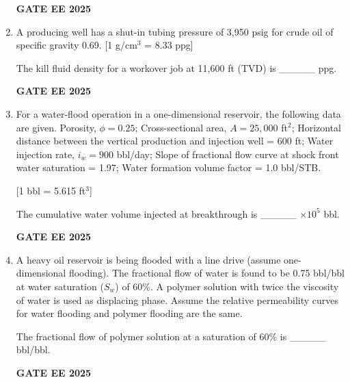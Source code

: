 \documentclass{article}
\begin{document}
\begin{enumerate}[label=Q.\arabic*,start=26]
    \textbf{GATE EE 2025}
    
    \item A producing well has a shut-in tubing pressure of 3,950 psig for crude oil of specific gravity 0.69. [1 g/cm$^3$ = 8.33 ppg]
    
    The kill fluid density for a workover job at 11,600 ft (TVD) is \_\_\_\_\_ ppg.
    
    \textbf{GATE EE 2025}
    
    \item For a water-flood operation in a one-dimensional reservoir, the following data are given. Porosity, $\phi = 0.25$; Cross-sectional area, $A = 25,000$ ft$^2$; Horizontal distance between the vertical production and injection well = 600 ft; Water injection rate, $i_w = 900$ bbl/day; Slope of fractional flow curve at shock front water saturation = 1.97; Water formation volume factor = 1.0 bbl/STB.
    
    [1 bbl = 5.615 ft$^3$]
    
    The cumulative water volume injected at breakthrough is \_\_\_\_\_ $\times 10^5$ bbl.
    
    \textbf{GATE EE 2025}
    
    \item A heavy oil reservoir is being flooded with a line drive (assume one-dimensional flooding). The fractional flow of water is found to be 0.75 bbl/bbl at water saturation ($S_w$) of 60\%. A polymer solution with twice the viscosity of water is used as displacing phase. Assume the relative permeability curves for water flooding and polymer flooding are the same.
    
    The fractional flow of polymer solution at a saturation of 60\% is \_\_\_\_\_ bbl/bbl.
    
    \textbf{GATE EE 2025}
\end{enumerate}
\end{document}
